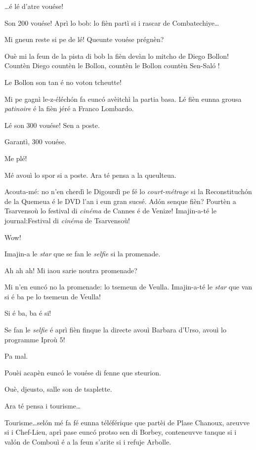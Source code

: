 \begin{drama}
\Ronnyspeaks \ldots é lé d'atre vouése!

\Laurentspeaks Son 200 vouése! Aprì lo bob: lo fièn partì si i rascar de Combatechiye\ldots

\Ronnyspeaks Mi gneun reste si pe de lé! Queunte vouése prégnèn?

\Laurentspeaks Ouè mi la feun de la pista di bob la fièn devàn lo mitcho de Diego Bollon! Countèn Diego countèn le Bollon, countèn le Bollon countèn Sen-Sal\'o !

\Ronnyspeaks Le Bollon son tan é no voton tcheutte!

\Laurentspeaks Mi pe gagnì le-z-éléch\'on fa euncó avèitchì la partia basa. Lé fièn eunna grousa \textit{patinoire} é la fièn jéré a Franco Lombardo.

\Ronnyspeaks Lé son 300 vouése! Sen a poste.

\Laurentspeaks Garantì,  300 vouése.

\Ronnyspeaks Me plé!

\Laurentspeaks Mé avouì lo spor si a poste. Ara té pensa a la queulteua.

\Ronnyspeaks Acouta-mé: no n'en cherdì le Digourdì pe fé lo \textit{court-mé\-tra\-ge} si la Reconstituch\'on de la Quemeua é le DVD l'an i eun gran sucsé. Ad\'on senque fièn? Pourtèn a Tsarvensoù lo festival di \textit{cinéma} de Cannes é de Venize! Imajin-a-té le journal:\og Festival di \textit{cinéma} de Tsarvensoù\fg!

\Laurentspeaks Wow!

\Ronnyspeaks Imajin-a le \textit{star} que se fan le \textit{selfie} si la promenade.

\Laurentspeaks Ah ah ah! Mi iaou sarie noutra promenade?

\Ronnyspeaks Mi n'en euncó no la promenade: lo tsemeun de Veulla. Imajin-a-té le \textit{star} que van si é ba pe lo tsemeun de Veulla!

\Laurentspeaks Si é ba, ba é si!

\Ronnyspeaks Se fan le \textit{selfie} é aprì fièn finque la directe avouì Barbara d'Urso, avouì lo programme \og Iproù 5\fg{}!

\Laurentspeaks Pa mal.

\Ronnyspeaks Pouèi acapèn euncó le vouése di fenne que steurion.

\Laurentspeaks Ouè, djeusto, salle son de tsaplette.

\Ronnyspeaks Ara té pensa i tourisme\ldots

\Laurentspeaks Tourisme\ldots sel\'on mé fa fé eunna téléférique que partèi de Plase Chanoux, areuvve si i Chef-Lieu, aprì pase euncó protso sen di Borbey, conteneuvve tanque si i val\'on de Combouì é a la feun s'arite si i refuje Arbolle.


\end{drama}
